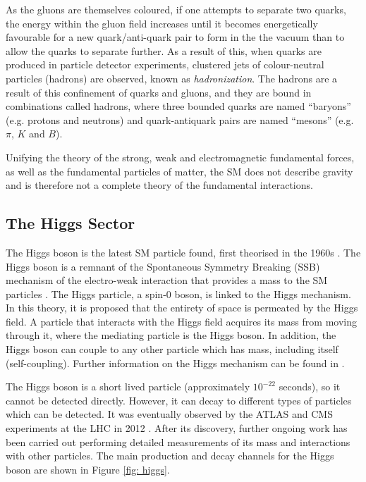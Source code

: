 As the gluons are themselves coloured, if one attempts to separate two quarks, the energy within the gluon field increases until it becomes energetically favourable for a new quark/anti-quark pair to form in the the vacuum than to allow the quarks to separate further. As a result of this, when quarks are produced in particle detector experiments, clustered jets of colour-neutral particles (hadrons) are observed, known as \textit{hadronization}. The hadrons are a result of this confinement of quarks and gluons, and they are bound in combinations called hadrons, where three bounded quarks are named “baryons” (e.g. protons and neutrons) and quark-antiquark pairs are named “mesons” (e.g. $\pi$, $K$ and $B$).

Unifying the theory of the strong, weak and electromagnetic fundamental forces, as well as the fundamental particles of matter, the SM does not describe gravity and is therefore not a complete theory of the fundamental interactions.





\subsection{The Higgs Sector}

The Higgs boson is the latest SM particle found, first theorised in the 1960s \cite{PhysRevLett.13.321, PhysRevLett.13.508, PhysRevLett.13.585}. The Higgs boson is a remnant of the Spontaneous Symmetry Breaking (SSB) mechanism of the electro-weak interaction that provides a mass to the SM particles \cite{doi:10.1098/rsta.2014.0033}. The Higgs particle, a spin-0 boson, is linked to the Higgs mechanism. In this theory, it is proposed that the entirety of space is permeated by the Higgs field. A particle that interacts with the Higgs field acquires its mass from moving through it, where the mediating particle is the Higgs boson. In addition, the Higgs boson can couple to any other particle which has mass, including itself (self-coupling). Further information on the Higgs mechanism can be found in \cite{Bednyakov_2008}. 

The Higgs boson is a short lived particle (approximately $10^{-22}$ seconds), so it cannot be detected directly. However, it can decay to different types of particles which can be detected. It was eventually observed by the ATLAS and CMS experiments at the LHC in 2012 \cite{higgs-20121, higgs-201230}. After its discovery, further ongoing work has been carried out performing detailed measurements of its mass and interactions with other particles. The main production and decay channels for the Higgs boson are shown in Figure \ref{fig: higgs}.

